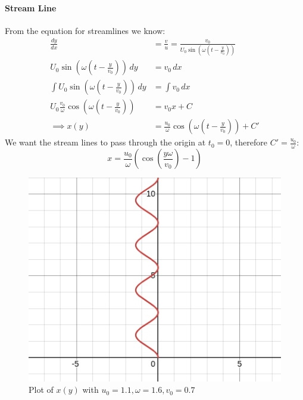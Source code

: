 \paragraph{Stream Line}
From the equation for streamlines we know:
\begin{equation*}
	\begin{split}
		\frac{dy}{dx} &= \frac vu  =\frac{v_0}{U_0\sin\left(\omega \left( t - \frac {y}{v_0}\right)\right)}\\
		U_0 \sin\left(\omega \left( t - \frac {y}{v_0}\right)\right) \,dy & =v_0 \,dx\\
		\int U_0 \sin\left(\omega \left( t - \frac {y}{v_0}\right)\right) \,dy & =\int v_0 \,dx\\ 
		U_0\frac{v_0}{\omega}\cos\left(\omega \left( t - \frac {y}{v_0}\right)\right) & =v_0x + C\\
		\implies x(y) &= \frac{u_0}{\omega}\cos\left(\omega \left( t - \frac {y}{v_0}\right)\right) + C'
	\end{split}
\end{equation*}
We want the stream lines to pass through the origin at $t_0=0$, therefore $C' = \frac {u_0}\omega$:
\begin{equation*}
	x = \frac {u_0}{\omega}\left(\cos\left(\frac{y\omega}{v_0}\right)-1\right)
\end{equation*}
\begin{figure}[H]
	\centering
	\includegraphics[width=0.4\linewidth]{Sketches/SprinklerStreamLine}
	\caption{Plot of $x(y)$ with $u_0=1.1, \omega= 1.6, v_0=0.7$}
	\label{fig:sprinklerstreamline}
\end{figure}


